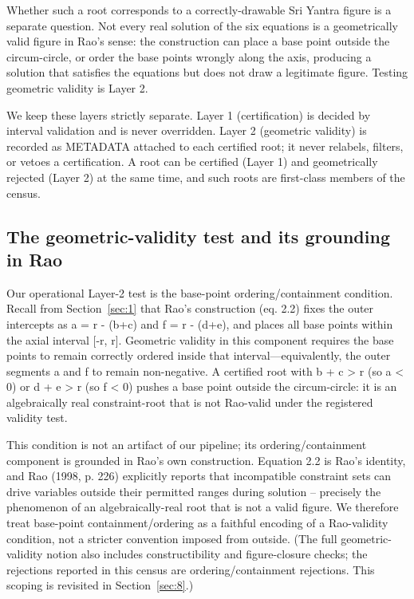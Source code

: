 \documentclass[pdflatex,sn-mathphys-num]{sn-jnl}
\begin{document}
Whether such a root corresponds to a correctly-drawable Sri Yantra figure is a separate question. Not every real solution of the six equations is a geometrically valid figure in Rao's sense: the construction can place
a base point outside the circum-circle, or order the base points wrongly along the axis, producing a solution that satisfies the equations but does not draw a legitimate figure. Testing geometric validity is Layer 2.

We keep these layers strictly separate. Layer 1 (certification) is decided by interval validation and is never overridden. Layer 2 (geometric validity) is recorded as METADATA attached to each certified root; it never relabels, filters, or vetoes a certification. A root can be certified (Layer 1) and
geometrically rejected (Layer 2) at the same time, and such roots are first-class members of the census.

\subsection{The geometric-validity test and its grounding in Rao}\label{sec:2.2}

Our operational Layer-2 test is the base-point ordering/containment condition. Recall from Section~\ref{sec:1} that Rao's construction (eq. 2.2) fixes the outer intercepts as a = r - (b+c) and f = r - (d+e), and places all base points within the axial interval [-r, r]. Geometric validity in this component
requires the base points to remain correctly ordered inside that interval---equivalently, the outer segments a and f to remain non-negative. A certified root with b + c > r (so a < 0) or d + e > r (so f < 0) pushes a base point outside the circum-circle: it is an algebraically real constraint-root that
is not Rao-valid under the registered validity test.

This condition is not an artifact of our pipeline; its ordering/containment component is grounded in Rao's own construction. Equation 2.2 is Rao's identity, and Rao (1998, p. 226) explicitly reports that incompatible constraint sets can drive variables outside their permitted ranges during solution -- precisely the phenomenon of an algebraically-real root that is not a valid figure. We therefore
treat base-point containment/ordering as a faithful encoding of a Rao-validity condition, not a stricter convention imposed from outside. (The full geometric-validity notion also includes constructibility and figure-closure checks; the rejections reported in this census are ordering/containment rejections. This scoping is revisited in Section~\ref{sec:8}.)
\end{document}
